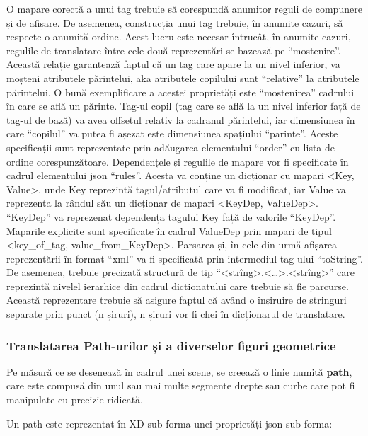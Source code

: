 O mapare corectă a unui tag trebuie să corespundă anumitor reguli de compunere și de afișare. De asemenea, construcția unui tag trebuie, în anumite cazuri, să respecte o anumită ordine. Acest lucru este necesar întrucât, în anumite cazuri, regulile de translatare între cele două reprezentări se bazează pe “mostenire”. Această relație garantează faptul că un tag care apare la un nivel inferior, va moșteni atributele părintelui, aka atributele copilului sunt “relative” la atributele părintelui. O bună exemplificare a acestei proprietăți este “mostenirea” cadrului în care se află un părinte. Tag-ul copil (tag care se află la un nivel inferior față de tag-ul de bază) va avea offsetul relativ la cadranul părintelui, iar dimensiunea în care “copilul” va putea fi așezat este dimensiunea spațiului “parinte”. Aceste specificații sunt reprezentate prin adăugarea elementului “order” cu lista de ordine corespunzătoare. 
Dependențele și regulile de mapare vor fi specificate în cadrul elementului json “rules”. Acesta va conține un dicționar cu mapari <Key, Value>, unde Key reprezintă tagul/atributul care va fi modificat, iar Value va reprezenta la rândul său un dicționar de mapari <KeyDep, ValueDep>.  “KeyDep” va reprezenat dependența tagului Key față de valorile “KeyDep”. Maparile explicite sunt specificate în cadrul ValueDep prin mapari de tipul <key_of_tag, value_from_KeyDep>. 
Parsarea și, în cele din urmă afișarea reprezentării în format “xml” va fi specificată prin intermediul tag-ului “toString”. 
De asemenea, trebuie precizată structură de tip “<strîng>.<…>.<strîng>” care reprezintă nivelel ierarhice din cadrul dictionatului care trebuie să fie parcurse. Această reprezentare trebuie să asigure faptul că având o înșiruire de stringuri separate prin punct (n șiruri), n șiruri vor fi chei în dicționarul de translatare. 

\subsubsection{Translatarea Path-urilor și a diverselor figuri geometrice}

Pe măsură ce se desenează în cadrul unei scene, se creează o linie numită \textbf{path}, care este compusă din unul sau mai multe segmente drepte sau curbe care pot fi manipulate cu precizie ridicată.

Un path este reprezentat în XD sub forma unei proprietăți json sub forma:



